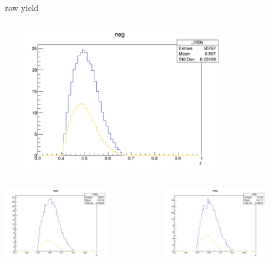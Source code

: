 \begin{frame}{raw yield}
\begin{columns}
\begin{column}[T]{0.25\textwidth}
\end{column}
\begin{column}[T]{0.25\textwidth}
\includegraphics[width = 0.7\textwidth]{results/yield/statistics/yield_x_Q2_z_0.45_3.898_0.50_neg.png}
\end{column}
\end{columns}
\begin{columns}
\begin{column}[T]{0.25\textwidth}
\includegraphics[width = 0.7\textwidth]{results/yield/statistics/yield_x_Q2_z_0.45_3.898_0.60_pos.png}
\end{column}
\begin{column}[T]{0.25\textwidth}
\includegraphics[width = 0.7\textwidth]{results/yield/statistics/yield_x_Q2_z_0.45_3.898_0.60_neg.png}

\end{column}
\end{columns}
\end{frame}
